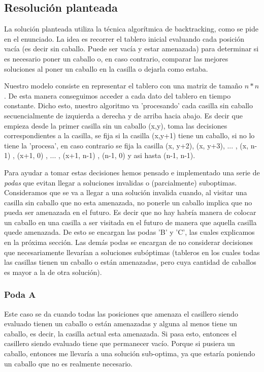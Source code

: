 \subsection{Resolución planteada}
La solución planteada utiliza la técnica algorítmica de backtracking, como se pide en el enunciado. La idea es recorrer el tablero inicial evaluando cada posición vacía (es decir sin caballo. Puede ser vacía y estar amenazada) para determinar si es necesario poner un caballo o, en caso contrario, comparar las mejores soluciones al poner un caballo en la casilla o dejarla como estaba.

Nuestro modelo consiste en representar el tablero con una matriz de tamaño $n*n$. De esta manera conseguimos acceder a cada dato del tablero en tiempo constante. Dicho esto, nuestro algoritmo va 'procesando' cada casilla sin caballo secuencialmente de izquierda a derecha y de arriba hacia abajo. Es decir que empieza desde la primer casilla sin un caballo (x,y), toma las decisiones correspondientes a la casilla, se fija si la casilla (x,y+1) tiene un caballo, si no lo tiene la 'procesa', en caso contrario se fija la casilla (x, y+2), (x, y+3), ... , (x, n-1) , (x+1, 0) , ... , (x+1, n-1) , (n-1, 0) y asi hasta (n-1, n-1).

Para ayudar a tomar estas decisiones hemos pensado e implementado una serie de \textit{podas} que evitan llegar a soluciones invalidas o (parcialmente) suboptimas. Consideramos que se va a llegar a una solución invalida cuando, al visitar una casilla sin caballo que no esta amenazada, no ponerle un caballo implica que no pueda ser amenazada en el futuro. Es decir que no hay habría manera de colocar un caballo en una casilla a ser visitada en el futuro de manera que aquella casilla quede amenazada. De esto se encargan las podas 'B' y 'C', las cuales explicamos en la próxima sección. Las demás podas se encargan de no considerar decisiones que necesariamente llevarían a soluciones subóptimas (tableros en los cuales todas las casillas tienen un caballo o están amenazadas, pero cuya cantidad de caballos es mayor a la de otra solución).


\subsubsection{Poda A}
Este caso se da cuando todas las posiciones que amenaza el casillero siendo evaluado tienen un caballo o están amenazadas y alguna al menos tiene un caballo, es decir, la casilla actual esta amenazada.
Si pasa esto, entonces el casillero siendo evaluado tiene que permanecer vacío. Porque si pusiera un caballo, entonces me llevaría a una solución sub-optima, ya que estaría poniendo un caballo que no es realmente necesario.

